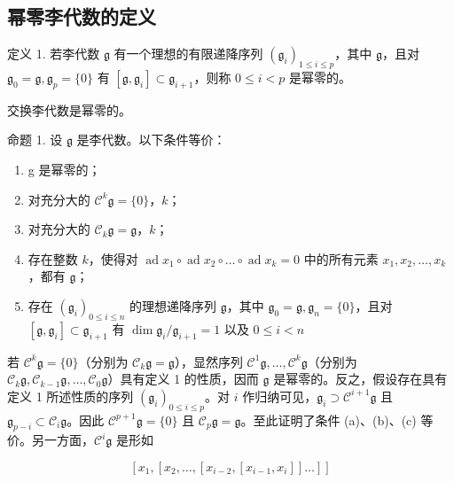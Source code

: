 \subsection{幂零李代数的定义}

定义 1. 若李代数 \(\mathfrak{g}\) 有一个理想的有限递降序列 \((\mathfrak{g}_i)_{1\leqslant i\leqslant p}\)，其中 \(\mathfrak{g}\)，且对 \(\mathfrak{g}_0 = \mathfrak{g},\mathfrak{g}_p = \{0\}\) 有 \([\mathfrak{g},\mathfrak{g}_i]\subset \mathfrak{g}_{i + 1}\)，则称 \(0\leqslant i < p\) 是幂零的。

交换李代数是幂零的。

命题 1. 设 \(\mathfrak{g}\) 是李代数。以下条件等价：

\begin{enumerate}
\def\labelenumi{(\alph{enumi})}
\item
  g 是幂零的；
\item
  对充分大的 \(\mathcal{C}^k\mathfrak{g} = \{0\}\)，\(k\)；
\item
  对充分大的 \(\mathcal{C}_k\mathfrak{g} = \mathfrak{g}\)，\(k\)；
\item
  存在整数 \(k\)，使得对 \(\operatorname{ad} x_1 \circ \operatorname{ad} x_2 \circ \dots \circ \operatorname{ad} x_k = 0\) 中的所有元素 \(x_1, x_2, \ldots, x_k\)，都有 \(\mathfrak{g}\)；
\item
  存在 \((\mathfrak{g}_i)_{0\leqslant i\leqslant n}\) 的理想递降序列 \(\mathfrak{g}\)，其中 \(\mathfrak{g}_0 = \mathfrak{g},\mathfrak{g}_n = \{0\}\)，且对 \([\mathfrak{g},\mathfrak{g}_i]\subset \mathfrak{g}_{i + 1}\) 有 \(\dim \mathfrak{g}_i / \mathfrak{g}_{i + 1} = 1\) 以及 \(0\leqslant i <   n\)
\end{enumerate}

若 \(\mathcal{C}^k\mathfrak{g} = \{0\}\)（分别为 \(\mathcal{C}_k\mathfrak{g} = \mathfrak{g}\)），显然序列 \(\mathcal{C}^1\mathfrak{g},\ldots ,\mathcal{C}^k\mathfrak{g}\)（分别为 \(\mathcal{C}_k\mathfrak{g},\mathcal{C}_{k - 1}\mathfrak{g},\ldots ,\mathcal{C}_0\mathfrak{g}\)）具有定义 1 的性质，因而 \(\mathfrak{g}\) 是幂零的。反之，假设存在具有定义 1 所述性质的序列 \((\mathfrak{g}_i)_{0\leqslant i\leqslant p}\)。对 \(i\) 作归纳可见，\(\mathfrak{g}_i\supset \mathcal{C}^{i + 1}\mathfrak{g}\) 且 \(\mathfrak{g}_{p - i}\subset \mathcal{C}_i\mathfrak{g}\)。因此 \(\mathcal{C}^{p + 1}\mathfrak{g} = \{0\}\) 且 \(\mathcal{C}_p\mathfrak{g} = \mathfrak{g}\)。至此证明了条件 (a)、(b)、(c) 等价。另一方面，\(\mathcal{C}^i\mathfrak{g}\) 是形如

\[
\left[ x _ {1}, \left[ x _ {2}, \dots , \left[ x _ {i - 2}, \left[ x _ {i - 1}, x _ {i} \right] \right] \dots \right] \right]
\]

